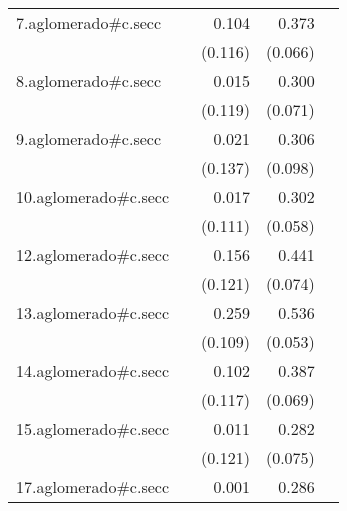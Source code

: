 {\begin{longtable}{l*{4}{D{.}{.}{-1}}}
\addlinespace
7.aglomerado#c.secc&                     &       0.104         &       0.373\sym{***}&                     \\
            &                     &     (0.116)         &     (0.066)         &                     \\
\addlinespace
8.aglomerado#c.secc&                     &       0.015         &       0.300\sym{***}&                     \\
            &                     &     (0.119)         &     (0.071)         &                     \\
\addlinespace
9.aglomerado#c.secc&                     &       0.021         &       0.306\sym{**} &                     \\
            &                     &     (0.137)         &     (0.098)         &                     \\
\addlinespace
10.aglomerado#c.secc&                     &       0.017         &       0.302\sym{***}&                     \\
            &                     &     (0.111)         &     (0.058)         &                     \\
\addlinespace
12.aglomerado#c.secc&                     &       0.156         &       0.441\sym{***}&                     \\
            &                     &     (0.121)         &     (0.074)         &                     \\
\addlinespace
13.aglomerado#c.secc&                     &       0.259\sym{*}  &       0.536\sym{***}&                     \\
            &                     &     (0.109)         &     (0.053)         &                     \\
\addlinespace
14.aglomerado#c.secc&                     &       0.102         &       0.387\sym{***}&                     \\
            &                     &     (0.117)         &     (0.069)         &                     \\
\addlinespace
15.aglomerado#c.secc&                     &       0.011         &       0.282\sym{***}&                     \\
            &                     &     (0.121)         &     (0.075)         &                     \\
\addlinespace
17.aglomerado#c.secc&                     &       0.001         &       0.286\sym{***}&                     \\

\end{longtable}}
